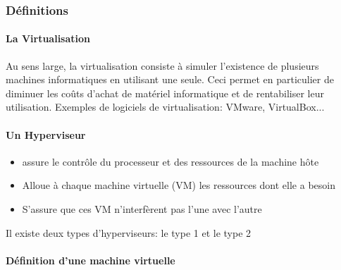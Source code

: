 \subsubsection{Définitions}

\paragraph{La Virtualisation}
 Au sens large, la virtualisation consiste à simuler l'existence de plusieurs machines informatiques en utilisant une seule.
 Ceci permet en particulier de diminuer les coûts d'achat de matériel informatique et de rentabiliser leur utilisation.
Exemples de logiciels de virtualisation: VMware, VirtualBox...

\paragraph{Un Hyperviseur}
\begin{itemize}
	\item assure le contrôle du processeur et des ressources de la machine hôte
	\item Alloue à chaque machine virtuelle (VM) les ressources dont elle a besoin
	\item S'assure que ces VM n'interfèrent pas l'une avec l'autre
\end{itemize}

Il existe deux types d'hyperviseurs: le type 1 et le type 2

\paragraph{Définition d'une machine virtuelle}

